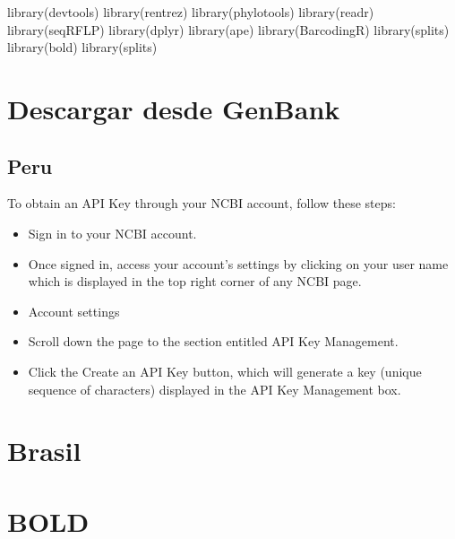 \documentclass[
]{book}
\newenvironment{Shaded}{\begin{snugshade}}{\end{snugshade}}
\newcommand{\FunctionTok}[1]{\textcolor[rgb]{0.00,0.00,0.00}{#1}}
\newcommand{\NormalTok}[1]{#1}
\providecommand{\tightlist}{%
  \setlength{\itemsep}{0pt}\setlength{\parskip}{0pt}}
\begin{document}
\begin{Shaded}
\begin{Highlighting}[]
\FunctionTok{library}\NormalTok{(devtools)}
\FunctionTok{library}\NormalTok{(rentrez)}
\FunctionTok{library}\NormalTok{(phylotools)}
\FunctionTok{library}\NormalTok{(readr)}
\FunctionTok{library}\NormalTok{(seqRFLP)}
\FunctionTok{library}\NormalTok{(dplyr)}
\FunctionTok{library}\NormalTok{(ape)}
\FunctionTok{library}\NormalTok{(BarcodingR)}
\FunctionTok{library}\NormalTok{(splits)}
\FunctionTok{library}\NormalTok{(bold)}
\FunctionTok{library}\NormalTok{(splits)}
\end{Highlighting}
\end{Shaded}

\hypertarget{descargar-desde-genbank}{%
\section*{Descargar desde GenBank}\label{descargar-desde-genbank}}

\hypertarget{peru}{%
\subsection*{Peru}\label{peru}}

To obtain an API Key through your NCBI account, follow these steps:

\begin{itemize}
\tightlist
\item
  Sign in to your NCBI account.
\item
  Once signed in, access your account's settings by clicking on your user name which is displayed in the top right corner of any NCBI page.
\item
  Account settings
\item
  Scroll down the page to the section entitled API Key Management.
\item
  Click the Create an API Key button, which will generate a key (unique sequence of characters) displayed in the API Key Management box.
\end{itemize}

\hypertarget{brasil}{%
\section*{Brasil}\label{brasil}}

\hypertarget{bold}{%
\section*{BOLD}\label{bold}}
\end{document}

